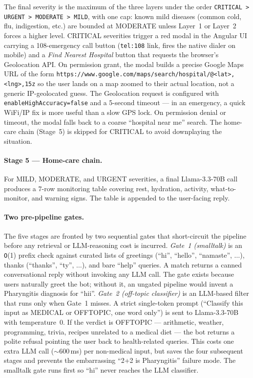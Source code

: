 \documentclass[12pt]{caltech_thesis}
\begin{document}
The final severity is the maximum of the three layers under the order
\texttt{CRITICAL > URGENT > MODERATE > MILD}, with one cap: known mild
diseases (common cold, flu, indigestion, etc.) are bounded at MODERATE
unless Layer~1 or Layer~2 forces a higher level. CRITICAL severities
trigger a red modal in the Angular UI carrying a 108-emergency call
button (\texttt{tel:108} link, fires the native dialer on mobile) and
a \emph{Find Nearest Hospital} button that requests the browser's
Geolocation API. On permission grant, the modal builds a precise
Google Maps URL of the form
\texttt{https://www.google.com/maps/search/hospital/@\textless lat\textgreater,\textless lng\textgreater,15z}
so the user lands on a map zoomed to their actual location, not a
generic IP-geolocated guess. The Geolocation request is configured
with \texttt{enableHighAccuracy=false} and a 5-second timeout --- in
an emergency, a quick WiFi/IP fix is more useful than a slow GPS
lock. On permission denial or timeout, the modal falls back to a
coarse ``hospital near me'' search. The home-care chain (Stage~5) is
skipped for CRITICAL to avoid downplaying the situation.

\paragraph{Stage 5 --- Home-care chain.} For MILD, MODERATE, and URGENT
severities, a final Llama-3.3-70B call produces a 7-row monitoring table
covering rest, hydration, activity, what-to-monitor, and warning signs.
The table is appended to the user-facing reply.

\paragraph{Two pre-pipeline gates.} The five stages are fronted by two
sequential gates that short-circuit the pipeline before any retrieval or
LLM-reasoning cost is incurred. \textit{Gate~1 (smalltalk)} is an
\texttt{O}(1) prefix check against curated lists of greetings (``hi'',
``hello'', ``namaste'', $\ldots$), thanks (``thanks'', ``ty'', $\ldots$),
and bare ``help'' queries. A match returns a canned conversational
reply without invoking any LLM call. The gate exists because users
naturally greet the bot; without it, an ungated pipeline would invent a
Pharyngitis diagnosis for ``hii''. \textit{Gate~2 (off-topic
classifier)} is an LLM-based filter that runs only when Gate~1 misses.
A strict single-token prompt (``Classify this input as MEDICAL or
OFFTOPIC, one word only'') is sent to Llama-3.3-70B with temperature~0.
If the verdict is OFFTOPIC --- arithmetic, weather, programming,
trivia, recipes unrelated to a medical diet --- the bot returns a
polite refusal pointing the user back to health-related queries.
This costs one extra LLM call ($\sim$600\,ms) per non-medical input,
but saves the four subsequent stages and prevents the embarrassing
``2+2 is Pharyngitis'' failure mode. The smalltalk gate runs first so
``hi'' never reaches the LLM classifier.
\end{document}

